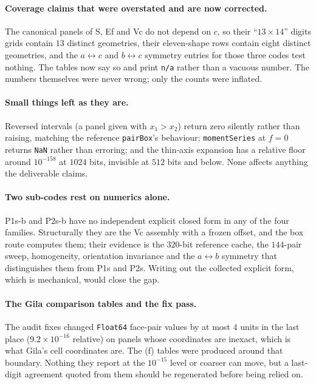 \documentclass[11pt]{article}
\theoremstyle{remark}
\newcommand{\code}[1]{\texttt{#1}}
\begin{document}
\paragraph{Coverage claims that were overstated and are now corrected.} The canonical panels
of S, Ef and Vc do not depend on $c$, so their ``$13\times14$'' digits grids contain $13$
distinct geometries, their eleven-shape rows contain eight distinct geometries, and the
$a\leftrightarrow c$ and $b\leftrightarrow c$ symmetry entries for those three codes test
nothing. The tables now say so and print \code{n/a} rather than a vacuous number. The
numbers themselves were never wrong; only the counts were inflated.

\paragraph{Small things left as they are.} Reversed intervals (a panel given with
$x_1 > x_2$) return zero silently rather than raising, matching the reference
\code{pairBox}'s behaviour; \code{momentSeries} at $f = 0$ returns \code{NaN} rather than
erroring; and the thin-axis expansion has a relative floor around $10^{-158}$ at $1024$
bits, invisible at $512$ bits and below. None affects anything the deliverable claims.

\paragraph{Two sub-codes rest on numerics alone.} P1s-b and P2s-b have no independent
explicit closed form in any of the four families. Structurally they are the Vc assembly
with a frozen offset, and the box route computes them; their evidence is the $320$-bit
reference cache, the $144$-pair sweep, homogeneity, orientation invariance and the
$a\leftrightarrow b$ symmetry that distinguishes them from P1s and P2s. Writing out the
collected explicit form, which is mechanical, would close the gap.

\paragraph{The Gila comparison tables and the fix pass.} The audit fixes changed
\code{Float64} face-pair values by at most $4$ units in the last place ($9.2\times10^{-16}$
relative) on panels whose coordinates are inexact, which is what Gila's cell coordinates
are. The (f) tables were produced around that boundary. Nothing they report at the
$10^{-15}$ level or coarser can move, but a last-digit agreement quoted from them should be
regenerated before being relied on.
\end{document}
